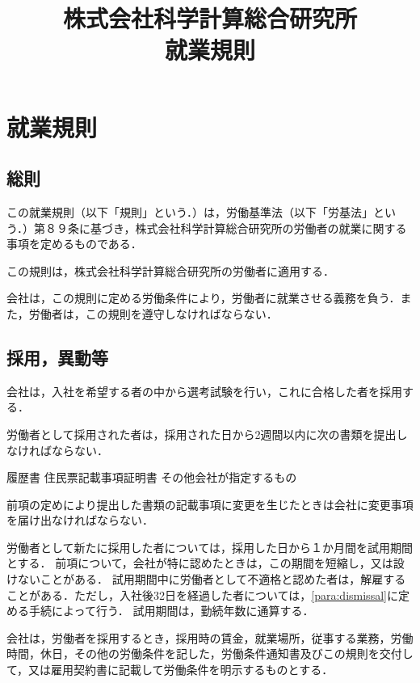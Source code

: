 \documentclass[11pt,a4paper]{jsarticle}
\begin{document}
\title{株式会社科学計算総合研究所\\就業規則}
\date{}
\maketitle
\section{就業規則}
\subsection{総則}
この就業規則（以下「規則」という．）は，労働基準法（以下「労基法」という．）第８９条に基づき，株式会社科学計算総合研究所の労働者の就業に関する事項を定めるものである．

この規則は，株式会社科学計算総合研究所の労働者に適用する．

会社は，この規則に定める労働条件により，労働者に就業させる義務を負う．また，労働者は，この規則を遵守しなければならない．

\subsection{採用，異動等}
会社は，入社を希望する者の中から選考試験を行い，これに合格した者を採用する．

労働者として採用された者は，採用された日から2週間以内に次の書類を提出しなければならない．
\begin{enumerate}
	\itm 履歴書
	\itm 住民票記載事項証明書
	\itm その他会社が指定するもの
\end{enumerate}
\term
前項の定めにより提出した書類の記載事項に変更を生じたときは会社に変更事項を届け出なければならない．

労働者として新たに採用した者については，採用した日から１か月間を試用期間とする．
\term
前項について，会社が特に認めたときは，この期間を短縮し，又は設けないことがある．
\term
試用期間中に労働者として不適格と認めた者は，解雇することがある．ただし，入社後32日を経過した者については，\ref{para:dismissal}に定める手続によって行う．
\term
試用期間は，勤続年数に通算する．

会社は，労働者を採用するとき，採用時の賃金，就業場所，従事する業務，労働時間，休日，その他の労働条件を記した，労働条件通知書及びこの規則を交付して，又は雇用契約書に記載して労働条件を明示するものとする．
\end{document}
